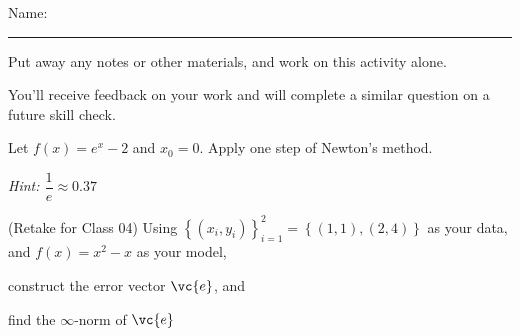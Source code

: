 \documentclass[12pt,letterpaper,noanswers]{exam}
\begin{document}
 \pdfpageheight 11in 
  \pdfpagewidth 8.5in

\noindent Name: \rule{2.5in}{0.5pt}

\noindent Put away any notes or other materials, and work on this activity alone.

\noindent You'll receive feedback on your work and will complete a similar question on a future skill check.


\begin{questions}
\item
Let $f(x) = e^x - 2$ and $x_0 = 0$.  Apply one step of Newton's method.

\emph{Hint: $\dfrac{1}{e}\approx0.37$}


\vspace{9cm}
\item (Retake for Class 04)
Using $\left\{(x_i,y_i)\right\}_{i=1}^2 = \left\{(1,1), (2,4)\right\}$ as your data, and $f(x) = x^2-x$ as your model, 
\begin{parts}
\item construct the error vector $\vc{e}$, and
\item find the $\infty$-norm of $\vc{e}$
\end{parts}
\end{questions}
\end{document}
